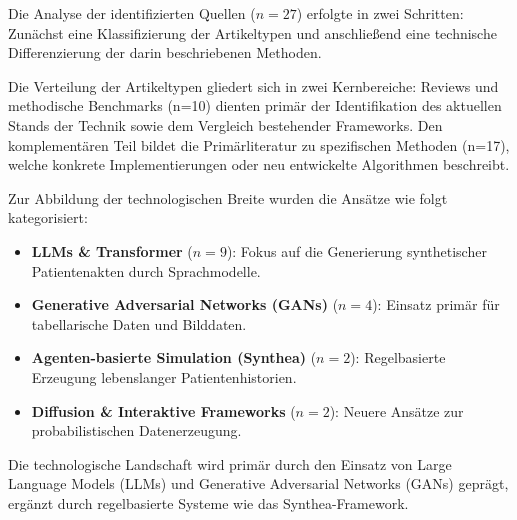 \begin{description}[style=nextline, font=\bfseries\sffamily]
    \item[Ergebnisse]

        Die Analyse der identifizierten Quellen ($n = 27$) erfolgte in zwei Schritten: Zunächst eine Klassifizierung der Artikeltypen und anschließend eine technische Differenzierung der darin beschriebenen Methoden.
    \item[Verteilung der Artikeltypen]
        Die Verteilung der Artikeltypen gliedert sich in zwei Kernbereiche: Reviews und methodische Benchmarks (n=10) dienten primär der Identifikation des aktuellen Stands der Technik sowie dem Vergleich bestehender Frameworks. Den komplementären Teil bildet die Primärliteratur zu spezifischen Methoden (n=17), welche konkrete Implementierungen oder neu entwickelte Algorithmen beschreibt.
    \item[Eingesetzte Technologien] 
        Zur Abbildung der technologischen Breite wurden die Ansätze wie folgt kategorisiert:
        
        \begin{itemize}[leftmargin=1.5em, labelsep=0.5em, itemsep=4pt, topsep=4pt]
            \item \textbf{LLMs \& Transformer} ($n = 9$): 
            Fokus auf die Generierung synthetischer Patientenakten durch Sprachmodelle.
            
            \item \textbf{Generative Adversarial Networks (GANs)} ($n = 4$): 
            Einsatz primär für tabellarische Daten und Bilddaten.
            
            \item \textbf{Agenten-basierte Simulation (Synthea)} ($n = 2$): 
            Regelbasierte Erzeugung lebenslanger Patientenhistorien.
            
            \item \textbf{Diffusion \& Interaktive Frameworks} ($n = 2$): 
            Neuere Ansätze zur probabilistischen Datenerzeugung.
        \end{itemize}
    \item[Beantwortung]
        Die technologische Landschaft wird primär durch den Einsatz von Large Language Models (LLMs) und Generative Adversarial Networks (GANs) geprägt, ergänzt durch regelbasierte Systeme wie das Synthea-Framework.
\end{description}

